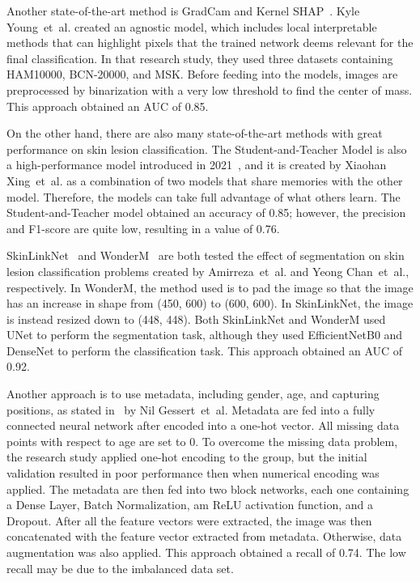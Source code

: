 \documentclass[sensors,article,accept,pdftex,moreauthors]{Definitions/mdpi}
\begin{document}
{		{Another state-of-the-art method is GradCam and Kernel SHAP~\mbox{\cite{06612}}. Kyle Young~et~al. created an agnostic model, which includes local interpretable methods that can highlight pixels that the trained network deems relevant for the final classification. In that research study, they used three datasets containing HAM10000, BCN-20000, and MSK. Before feeding into the models,  images are preprocessed by binarization with a very low threshold to find the center of mass. This approach obtained an  AUC of 0.85.} %
		
		On the other hand, there are also many state-of-the-art methods with great performance on skin lesion classification. The Student-and-Teacher Model is also a high-performance model introduced in 2021~\mbox{\cite{03225}}, and it is created by Xiaohan Xing~et~al. as a combination of two models that share  memories with the other model. Therefore, the models can take full advantage of what others learn. The Student-and-Teacher model obtained an accuracy of 0.85; however, the precision and F1-score are quite low, resulting in a value of 0.76.
		
		SkinLinkNet~\mbox{\cite{12602}} and WonderM~\mbox{\cite{03426}} are both tested the effect of segmentation on skin lesion classification problems created by Amirreza~et~al. and Yeong Chan~et~al., respectively. In WonderM, the method used is to pad the image so that the image has an increase in shape  from (450, 600) to (600, 600). In SkinLinkNet,  the image is instead resized down to (448, 448). Both  SkinLinkNet and WonderM used UNet to perform the segmentation task, although they used EfficientNetB0 and DenseNet to perform the classification task. This approach obtained an AUC of 0.92.
		
		Another approach is to use metadata, including gender, age, and capturing positions, as stated in~\mbox{\cite{03910}} by Nil Gessert~et~al.  Metadata are fed into a fully connected neural network after  encoded into a one-hot vector. All missing data points with respect to age are set to 0. To overcome the missing data problem, the research study applied one-hot encoding to the group, but the initial validation resulted in poor performance then when numerical encoding was applied. The metadata are then fed into two block networks, each one containing a Dense Layer, Batch Normalization, am ReLU activation function, and a Dropout. After all the feature vectors were extracted, the image was then concatenated with the feature vector extracted from metadata. Otherwise,  data augmentation was also applied. This approach obtained a  recall of 0.74. The low recall may be due to the imbalanced data set.
		
}
\end{document}

